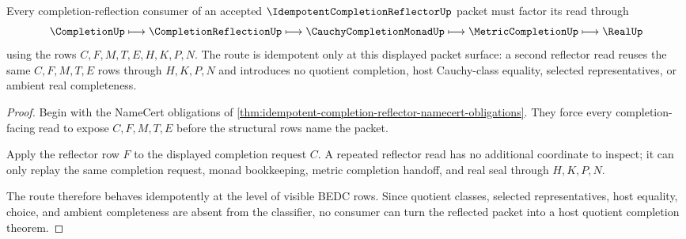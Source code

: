 \begin{theorem}
\label{thm:idempotent-completion-reflector-route}
Every completion-reflection consumer of an accepted $\IdempotentCompletionReflectorUp$ packet must factor its read through
$$
\CompletionUp \longmapsto \CompletionReflectionUp \longmapsto \CauchyCompletionMonadUp \longmapsto \MetricCompletionUp \longmapsto \RealUp
$$
using the rows $C,F,M,T,E,H,K,P,N$. The route is idempotent only at this displayed packet surface: a second reflector read reuses the same $C,F,M,T,E$ rows through $H,K,P,N$ and introduces no quotient completion, host Cauchy-class equality, selected representatives, or ambient real completeness.
\end{theorem}
\begin{proof}
Begin with the NameCert obligations of \autoref{thm:idempotent-completion-reflector-namecert-obligations}. They force every completion-facing read to expose $C,F,M,T,E$ before the structural rows name the packet.

Apply the reflector row $F$ to the displayed completion request $C$. A repeated reflector read has no additional coordinate to inspect; it can only replay the same completion request, monad bookkeeping, metric completion handoff, and real seal through $H,K,P,N$.

The route therefore behaves idempotently at the level of visible BEDC rows. Since quotient classes, selected representatives, host equality, choice, and ambient completeness are absent from the classifier, no consumer can turn the reflected packet into a host quotient completion theorem.
\end{proof}




